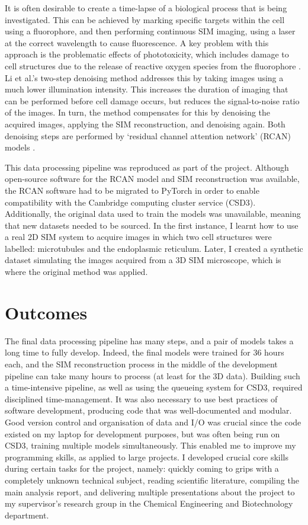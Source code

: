 \documentclass[12pt]{article}
\begin{document}
It is often desirable to create a time-lapse of a biological process that is being investigated.
This can be achieved by marking specific targets within the cell using a fluorophore,
and then performing continuous SIM imaging, using a laser at the correct wavelength to cause fluorescence.
A key problem with this approach is the problematic effects of phototoxicity,
which includes damage to cell structures due to the release of reactive oxygen species from the fluorophore \cite{phototoxicity}.
Li et al.'s two-step denoising method \cite{keypaper} addresses this by taking images using a much lower illumination intensity.
This increases the duration of imaging that can be performed before cell damage occurs, but reduces the signal-to-noise ratio of the images.
In turn, the method compensates for this by denoising the acquired images, applying the SIM reconstruction, and denoising again.
Both denoising steps are performed by `residual channel attention network' (RCAN) models \cite{keypaper}.

This data processing pipeline was reproduced as part of the project.
Although open-source software for the RCAN model and SIM reconstruction was available,
the RCAN software had to be migrated to PyTorch in order to enable compatibility with the Cambridge computing cluster service (CSD3).
Additionally, the original data used to train the models was unavailable,
meaning that new datasets needed to be sourced.
In the first instance, I learnt how to use a real 2D SIM system to acquire images in which two cell structures were labelled: microtubules and the endoplasmic reticulum.
Later, I created a synthetic dataset simulating the images acquired from a 3D SIM microscope,
which is where the original method was applied.

\section*{Outcomes}

The final data processing pipeline has many steps,
and a pair of models takes a long time to fully develop.
Indeed, the final models were trained for 36 hours each,
and the SIM reconstruction process in the middle of the development pipeline can take many hours to process (at least for the 3D data).
Building such a time-intensive pipeline, as well as using the queueing system for CSD3, required disciplined time-management.
It was also necessary to use best practices of software development, producing code that was well-documented and modular.
Good version control and organisation of data and I/O was crucial since the code existed on my laptop for development purposes,
but was often being run on CSD3, training multiple models simultaneously.
This enabled me to improve my programming skills, as applied to large projects.
I developed crucial core skills during certain tasks for the project, namely:
quickly coming to grips with a completely unknown technical subject,
reading scientific literature,
compiling the main analysis report,
and delivering multiple presentations about the project to my supervisor's research group in the Chemical Engineering and Biotechnology department.
\end{document}

